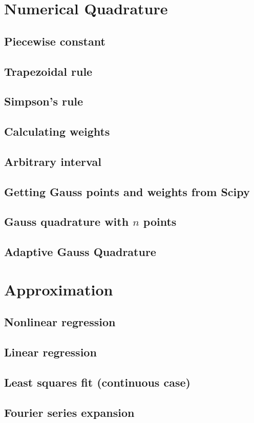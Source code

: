 \documentclass[article,A4,12pt]{llncs}
\begin{document}
\section{Numerical Quadrature}


\subsection{Piecewise constant}


\subsection{Trapezoidal rule}


\subsection{Simpson's rule}


\subsection{Calculating weights}


\subsection{Arbitrary interval}


\subsection{Getting Gauss points and weights from Scipy}


\subsection{Gauss quadrature with $n$ points}


\subsection{Adaptive Gauss Quadrature}



\section{Approximation}


\subsection{Nonlinear regression}


\subsection{Linear regression}

\subsection{Least squares fit (continuous case)}


\subsection{Fourier series expansion}
\end{document}
